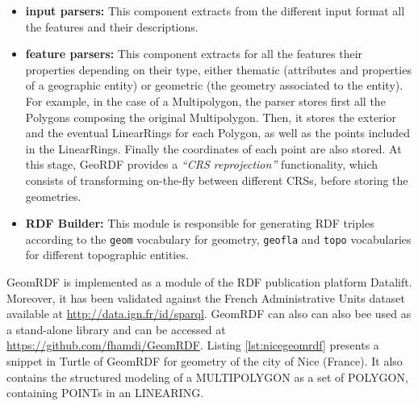 \begin{itemize}
\item \textbf{input parsers:} This component extracts from the different input format all the features and their descriptions.
\item \textbf{feature parsers:} This component extracts for all the features their properties depending on their type, either thematic (attributes and properties of a geographic entity) or geometric (the geometry associated to the entity). For example, in the case of a Multipolygon, the parser stores first all the Polygons composing the original Multipolygon. Then, it stores the exterior and the eventual LinearRings for each Polygon, as well as the points included in the LinearRings. Finally the coordinates of each point are also stored. At this stage, GeoRDF provides a \textit{``CRS reprojection''} functionality, which consists of transforming on-the-fly between different CRSs, before storing the geometries.

\item  \textbf{RDF Builder:} This module is responsible for generating RDF triples according to the \texttt{geom} vocabulary for geometry, \texttt{geofla} and \texttt{topo} vocabularies for different topographic entities.
\end{itemize}

GeomRDF is implemented as a module of the RDF publication platform Datalift. Moreover, it has been validated against the French Administrative Units dataset available at \url{http://data.ign.fr/id/sparql}. GeomRDF can also can also bee used as a stand-alone library and can be accessed at \url{https://github.com/fhamdi/GeomRDF}. Listing \ref{lst:nicegeomrdf} presents a snippet in Turtle \cite{turtle14} of GeomRDF for geometry of the city of Nice (France). It also contains the structured modeling of a MULTIPOLYGON as a set of POLYGON, containing POINTs in an LINEARING.

